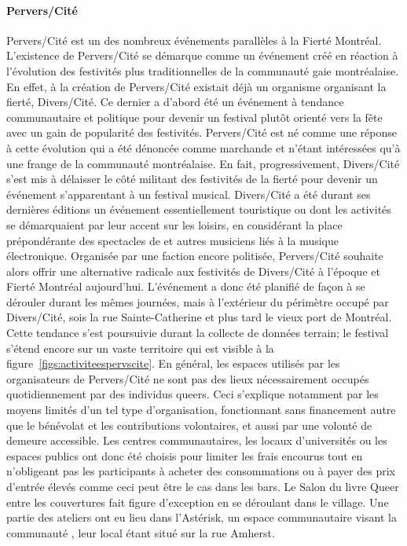 \paragraph{Pervers/Cité}
\label{subsec:perverscite}
Pervers/Cité est un des nombreux événements parallèles à la Fierté Montréal.
L'existence de Pervers/Cité se démarque comme un événement créé en réaction à l'évolution des festivités plus traditionnelles de la communauté gaie montréalaise.
En effet, à la création de Pervers/Cité existait déjà un organisme organisant la fierté, Divers/Cité.
Ce dernier a d'abord été un événement à tendance communautaire et politique pour devenir un festival plutôt orienté vers la fête avec un gain de popularité des festivités.
Pervers/Cité est né comme une réponse à cette évolution qui a été dénoncée comme marchande et n'étant intéressées qu'à une frange de la communauté \lgbt{} montréalaise.
En fait, progressivement, Divers/Cité s'est mis à délaisser le côté militant des festivités de la fierté pour devenir un événement s'apparentant à un festival musical.
Divers/Cité a été durant ses dernières éditions un événement essentiellement touristique ou dont les activités se démarquaient par leur accent sur les loisirs, en considérant la place prépondérante des spectacles de \dj{} et autres musiciens liés à la musique électronique.
Organisée par une faction encore politisée, Pervers/Cité souhaite alors offrir une alternative radicale aux festivités de Divers/Cité à l'époque et Fierté Montréal aujourd'hui.
L'événement a donc été planifié de façon à se dérouler durant les mêmes journées, mais à l'extérieur du périmètre occupé par Divers/Cité, sois la rue Sainte-Catherine et plus tard le vieux port de Montréal.
Cette tendance s'est poursuivie durant la collecte de données terrain; le festival s'étend encore sur un vaste territoire qui est visible à la figure~\ref{figs:activiteespervscite}.
En général, les espaces utilisés par les organisateurs de Pervers/Cité ne sont pas des lieux nécessairement occupés quotidiennement par des individus queers.
Ceci s'explique notamment par les moyens limités d'un tel type d'organisation, fonctionnant sans financement autre que le bénévolat et les contributions volontaires, et aussi par une volonté de demeure accessible.
Les centres communautaires, les locaux d'universités ou les espaces publics ont donc été choisis pour limiter les frais encourus tout en n’obligeant pas les participants à acheter des consommations ou à payer des prix d'entrée élevés comme ceci peut être le cas dans les bars.
Le Salon du livre Queer entre les couvertures fait figure d'exception en se déroulant dans le village.
Une partie des ateliers ont eu lieu dans l'Astérisk, un espace communautaire visant la communauté \lgbt{}, leur local étant situé sur la rue Amherst.


